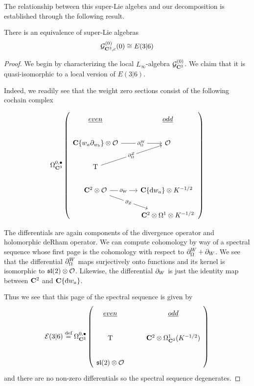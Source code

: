 \documentclass[../main.tex]{subfiles}
\begin{document}
The relationship between this super-Lie algebra and our decomposition is established through the following result.

\begin{prop}\label{prop:g0e36}
There is an equivalence of super-Lie algebras
\[
\mathcal{G}^{(0)}_{\mathbf{C}^3, c} (0) \cong E(3|6)
\]
\end{prop}
\begin{proof}
We begin by characterizing the local $L_\infty$-algebra $\mathcal{G}^{(0)}_{\mathbf{C}^3}$. We claim that it is quasi-isomorphic to a local version of $E(3|6)$. 

Indeed, we readily see that the weight zero sections consist of the following cochain complex

\begin{equation}
\Omega^{0,\bullet}_{\C^3} \left (
\begin{tikzcd}
\ul{even} & \ul{odd} \\
\C\{w_a\del_{w_b}\}\otimes \mc O\ar[r, "\del^W_\Omega" description]  & \mc O \\ 
\T \ar[ur, "\del^Z_\Omega" description] & \\
\C^2\otimes \mc O \ar[r, "\del_W" description]\ar[dr, "\del_Z" description] & \C\{\d w_a\} \otimes K^{-1/2}\ \\
& \C^2 \otimes \Omega^1\otimes K^{-1/2}
\end{tikzcd} \right)
\end{equation}

The differentials are again components of the divergence operator and holomorphic deRham operator. We can compute cohomology by way of a spectral sequence whose first page is the cohomology with respect to $\partial^W_\Omega + \partial_W$. We see that the differential $\partial^W_\Omega$ maps surjectively onto functions and its kernel is isomorphic to $\mathfrak{sl}(2) \otimes \mathcal{O}$. Likewise, the differential $\partial_W$ is just the identity map between $\mathbf{C}^2$ and $\mathbf{C}\{\mathrm{d} w_a\}$. 

Thus we see that this page of the spectral sequence is given by 
\begin{equation}
\mc E(3|6) \define \Omega^{0,\bullet}_{\C^3} \left (
\begin{tikzcd}
\ul{even} & \ul{odd} \\
\T & \C^2\otimes \Omega^1_{\C^3} (K^{-1/2}) \\
\mf {sl}(2)\otimes \mc O
\end{tikzcd} \right)
\end{equation}
and there are no non-zero differentials so the spectral sequence degenerates.


\end{proof}
\end{document}
